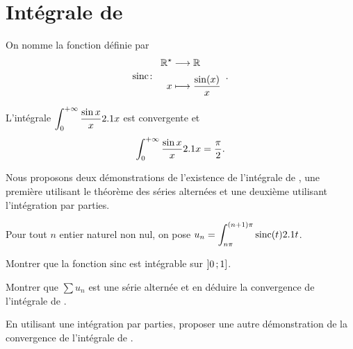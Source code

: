 \section{Intégrale de }\label{sec:intDirichlet}



\begin{defi}
    On nomme  la fonction définie par
    \[
    \fonction[\mathrm{sinc}]{\Re}{\R}{x}{\frac{\sin(x)}{x}}.
    \]
\end{defi}

\begin{theo}
L'intégrale $\displaystyle\int_{0}^{+\infty} \frac{\sin x}{x} 2.1 x$ est convergente et
    \[
    \int_{0}^{+\infty} \frac{\sin x}{x} 2.1 x = \frac{\pi}{2}.
    \]
\end{theo}

\begin{marginfigure}[0cm]
    
\end{marginfigure}

Nous proposons deux démonstrations de l'existence de l'intégrale de , une première utilisant le théorème des séries alternées et une deuxième utilisant l'intégration par parties.

\begin{exercice}
Pour tout $n$ entier naturel non nul, on pose $u_n = \displaystyle\int_{n\pi}^{(n+1)\pi} \mathrm{sinc}(t) 2.1 t$.
\begin{questions}
\item Montrer que la fonction $\mathrm{sinc}$ est intégrable sur $\left]0\,;1\right]$.

\item Montrer que $\sum u_n$ est une série alternée et en déduire la convergence de l'intégrale de .

\item En utilisant une intégration par parties, proposer une autre démonstration de la convergence de l'intégrale de .
\end{questions}
\end{exercice}

